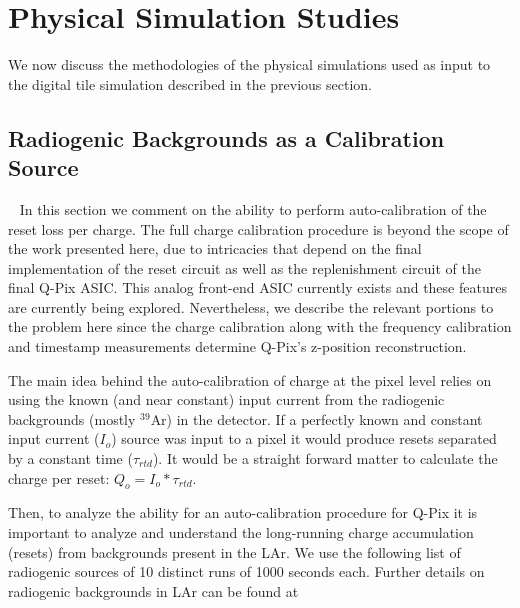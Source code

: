 \section{Physical Simulation Studies}
We now discuss the methodologies of the physical simulations used as input to the digital tile simulation described in the previous section.

\subsection{Radiogenic Backgrounds as a Calibration Source}~\label{sec:radiogenic_calib}
In this section we comment on the ability to perform auto-calibration of the reset loss per charge.
The full charge calibration procedure is beyond the scope of the work presented here, due to intricacies that depend on the final implementation of the reset circuit as well as the replenishment circuit of the final Q-Pix ASIC.
This analog front-end ASIC currently exists and these features are currently being explored.
Nevertheless, we describe the relevant portions to the problem here since the charge calibration along with the frequency calibration and timestamp measurements determine Q-Pix's z-position reconstruction.

The main idea behind the auto-calibration of charge at the pixel level relies on using the known (and near constant) input current from the radiogenic backgrounds (mostly $^{39}$Ar) in the detector. 
If a perfectly known and constant input current ($I_{o}$) source was input to a pixel it would produce resets separated by a constant time ($\tau_{rtd}$).
It would be a straight forward matter to calculate the charge per reset: $Q_{o} = I_{o}*\tau_{rtd}$.

Then, to analyze the ability for an auto-calibration procedure for Q-Pix it is important to analyze and understand the long-running charge accumulation (resets) from backgrounds present in the LAr.
We use the following list of radiogenic sources of 10 distinct runs of 1000 seconds each.
Further details on radiogenic backgrounds in LAr can be found at~\citep{DUNE-FD_TDRv4:Abi_2020, ar39_backgrounds, phd_backgrounds}

